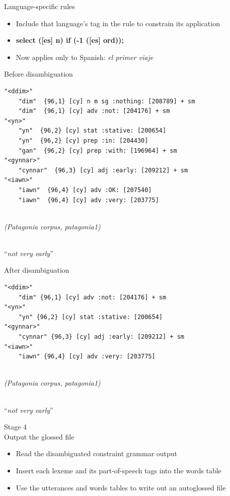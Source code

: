 \documentclass[hyperref={pdfpagelabels=false}, 14pt]{beamer}
\begin{document}
\begin{frame}{Language-specific rules}
\begin{itemize}
\item Include that language's tag in the rule to constrain its application
\item \begin{large}\textbf{select ([es] n) if (-1 ([es] ord));} \end{large}
\item Now applies only to Spanish: \textit{el primer viaje}
% 
\end{itemize}
\end{frame}


\begin{frame}[fragile]{Before disambiguation}
\begin{footnotesize}
\begin{BVerbatim}
"<ddim>"
    "dim"  {96,1} [cy] n m sg :nothing: [208789] + sm
    "dim"  {96,1} [cy] adv :not: [204176] + sm
"<yn>"
    "yn"  {96,2} [cy] stat :stative: [200654]
    "yn"  {96,2} [cy] prep :in: [204430]
    "gan"  {96,2} [cy] prep :with: [196964] + sm
"<gynnar>"
    "cynnar"  {96,3} [cy] adj :early: [209212] + sm
"<iawn>"
    "iawn"  {96,4} [cy] adv :OK: [207540]
    "iawn"  {96,4} [cy] adv :very: [203775]
\end{BVerbatim}
\\ \hfill\textit{(Patagonia corpus, patagonia1)}
\end{footnotesize}
\\ ``\textit{not very early}''
\end{frame}


\begin{frame}[fragile]{After disambiguation}
\begin{footnotesize}
\begin{BVerbatim}
"<ddim>"
    "dim" {96,1} [cy] adv :not: [204176] + sm
"<yn>"
    "yn" {96,2} [cy] stat :stative: [200654]
"<gynnar>"
    "cynnar" {96,3} [cy] adj :early: [209212] + sm
"<iawn>"
    "iawn" {96,4} [cy] adv :very: [203775]
\end{BVerbatim}
\\ \hfill\textit{(Patagonia corpus, patagonia1)}
\end{footnotesize}
\\ ``\textit{not very early}''
\end{frame}


\begin{frame}{Stage 4 \\ Output the glossed file}
\begin{itemize}
\item Read the disambiguated constraint grammar output
\item Insert each lexeme and its part-of-speech tags into the words table
\item Use the utterances and words tables to write out an autoglossed file
% 
\end{itemize}
\end{frame}
\end{document}
